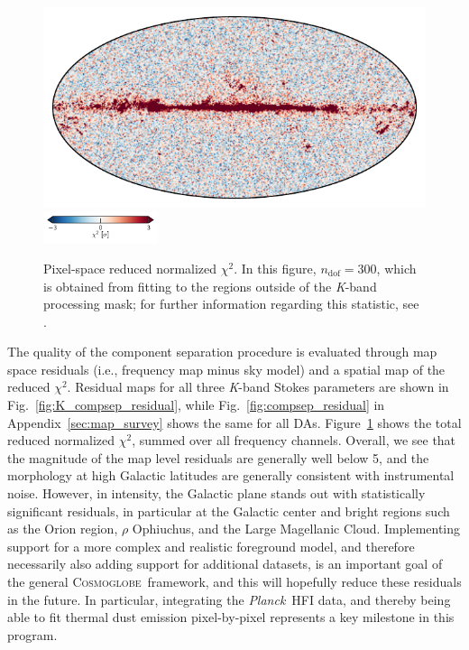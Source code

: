 \documentclass[twocolumn]{../../common/aa}
\def\Planck{\emph{Planck}}
\newcommand{\cosmoglobe}{\textsc{Cosmoglobe}}
\newcommand{\K}[0]{\textit K}
\begin{document}
\begin{figure}
	\centering
	\includegraphics[width=\linewidth]{figures/chisq_IQU.pdf}\\
	\includegraphics[width=0.3\textwidth]{figures/cbar_3sigma.pdf}
	\caption{Pixel-space reduced normalized $\chi^2$. In this figure, $n_\mathrm{dof}=300$, which is obtained from fitting to the regions outside of the \K-band processing mask; for further information regarding this statistic, see \citet{bp13}.}\label{fig:reduced_chisq}
\end{figure}

The quality of the component separation procedure is evaluated through map space residuals (i.e., frequency map minus sky model) and a spatial map of the reduced $\chi^2$. Residual maps for all three \K-band Stokes parameters are shown in Fig.~\ref{fig:K_compsep_residual}, while Fig.~\ref{fig:compsep_residual} in Appendix~\ref{sec:map_survey} shows the same for all DAs. Figure~\ref{fig:reduced_chisq} shows the total reduced normalized $\chi^2$, summed over all frequency channels. Overall, we see that the magnitude of the map level residuals are generally well below 5\muK, and the morphology at high Galactic latitudes are generally consistent with instrumental noise. However, in intensity, the Galactic plane stands out with statistically significant residuals, in particular at the Galactic center and bright regions such as the Orion region, $\rho$ Ophiuchus, and the Large Magellanic Cloud. Implementing support for a more complex and realistic foreground model, and therefore necessarily also adding support for additional datasets, is an important goal of the general \cosmoglobe\ framework, and this will hopefully reduce these residuals in the future. In particular, integrating the \Planck\ HFI data, and thereby being able to fit thermal dust emission pixel-by-pixel represents a key milestone in this program. 
\end{document}
